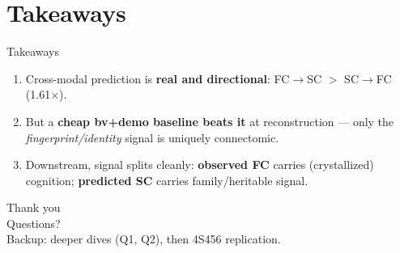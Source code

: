 \documentclass[aspectratio=169]{beamer}
\begin{document}
\section{Takeaways}\begin{frame}{Takeaways}\large\begin{enumerate}\item Cross-modal prediction is \textbf{real and directional}: FC$\rightarrow$SC $>$ SC$\rightarrow$FC (1.61$\times$).\item But a \textbf{cheap bv+demo baseline beats it} at reconstruction --- only the \emph{fingerprint/identity} signal is uniquely connectomic.\item Downstream, signal splits cleanly: \textbf{observed FC} carries (crystallized) cognition; \textbf{predicted SC} carries family/heritable signal.\end{enumerate}\end{frame}
\begin{frame}\centering\vfill{\Huge Thank you}\\[8pt]\large Questions?\\[12pt]\normalsize Backup: deeper dives (Q1, Q2), then 4S456 replication.\vfill\end{frame}
\end{document}
